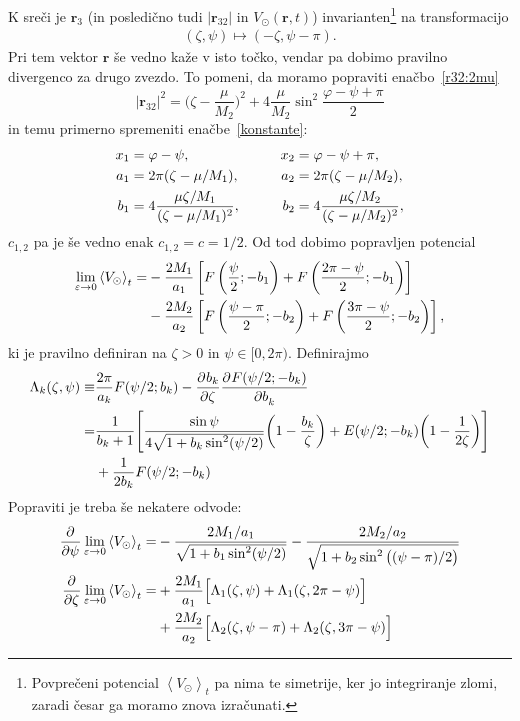 \documentclass[12pt, a4paper]{article}
\renewcommand{\r}{
    \ensuremath{\mathbf{r}}
}
\newcommand{\der}[3][]{
    \ensuremath{ \frac{\partial^{#1} #2}{\partial #3^{#1}} }
}
\newcommand{\avgt}[1]{
	\ensuremath{\left\langle #1 \right\rangle_t}
}
\begin{document}
K sre\v ci je $\r_3$ (in posledi\v cno tudi $|\r_{32}|$ in $V_\odot(\r,t)$) invarianten\footnote{Povpre\v ceni
potencial $\avgt{V_\odot}$ pa nima te simetrije, ker jo integriranje zlomi, zaradi \v cesar ga moramo znova
izra\v cunati.} na transformacijo
\begin{align*}
	(\zeta, \psi) \mapsto (-\zeta, \psi - \pi).
\end{align*}
Pri tem vektor $\r$ \v se vedno ka\v ze v isto to\v cko, vendar pa dobimo pravilno divergenco za drugo zvezdo.
To pomeni, da moramo popraviti ena\v cbo~\eqref{r32:2mu}
\begin{equation}
	|\r_{32}|^2 = \Big(\zeta - \frac{\mu}{M_2}\Big)^2 + 4\frac{\mu}{M_2}\sin^2\frac{\varphi - \psi + \pi}{2}
\end{equation}
in temu primerno spremeniti ena\v cbe~\eqref{konstante}:
\begin{alignat}{3}
	x_1 &= \varphi - \psi, \qquad& x_2 &= \varphi - \psi + \pi, \notag \\
	a_1 &= 2\pi(\zeta - \mu/M_1), \qquad& a_2 &= 2\pi(\zeta - \mu/M_2), \notag \\
	b_1 &= 4\frac{\mu\zeta/M_1}{(\zeta - \mu/M_1)^2}, \qquad& b_2 &= 4\frac{\mu\zeta/M_2}{(\zeta - \mu/M_2)^2},
\end{alignat}
$c_{1,2}$ pa je \v se vedno enak $c_{1,2} = c = 1/2$. Od tod dobimo popravljen potencial
\begin{align}
	\lim_{\varepsilon \to 0} \avgt{V_\odot} = &- \frac{2M_1}{a_1}\left[F\left(\frac{\psi}{2}; -b_1\right)
		+ F\left(\frac{2\pi - \psi}{2}; -b_1\right)\right] \notag \\
	&- \frac{2 M_2}{a_2}\left[F\left(\frac{\psi - \pi}{2}; -b_2\right)
		+ F\left(\frac{3\pi - \psi}{2}; -b_2\right)\right],
\end{align}
ki je pravilno definiran na $\zeta > 0$ in $\psi \in [0, 2\pi)$. Definirajmo
\begin{align}
	\Lambda_k (\zeta, \psi) \equiv &\frac{2\pi}{a_k}F(\psi/2;b_k) - \der{b_k}{\zeta}\der{F(\psi/2;-b_k)}{b_k} \notag \\
	= &\frac{1}{b_k + 1}\Bigg[\frac{\sin\psi}{4\sqrt{1 + b_k\sin^2(\psi/2)}}
		\bigg(1 - \frac{b_k}{\zeta}\bigg) + E(\psi/2; -b_k)\bigg(1 - \frac{1}{2\zeta}\bigg)\Bigg] \notag \\
	&+\frac{1}{2b_k}F(\psi/2; -b_k)
\end{align}
Popraviti je treba \v se nekatere odvode:
\begin{align}
	\der{}{\psi}\lim_{\varepsilon \to 0} \avgt{V_\odot} = &- \frac{2M_1/a_1}{\sqrt{1 + b_1\sin^2(\psi/2)}}
		- \frac{2M_2/a_2}{\sqrt{1 + b_2\sin^2\big((\psi - \pi)/2\big)}} \\
	\der{}{\zeta}\lim_{\varepsilon \to 0} \avgt{V_\odot} = &+ \frac{2M_1}{a_1}\Big[\Lambda_1(\zeta, \psi)
	+ \Lambda_1(\zeta, 2\pi - \psi)\Big] \notag \\
	&+ \frac{2M_2}{a_2}\Big[\Lambda_2(\zeta, \psi - \pi) + \Lambda_2(\zeta, 3\pi - \psi)\Big]
\end{align}
\end{document}
